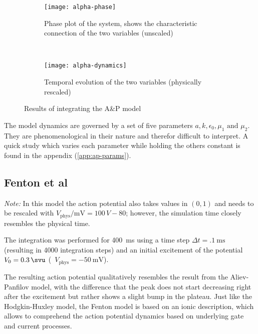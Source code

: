 \begin{figure}[h]
    \centering
    \begin{subfigure}[b]{.45\textwidth}
        \texttt{[image: alpha-phase]}
        \vspace{-\baselineskip}
        \label{fig:alphaphase}
        \caption{Phase plot of the system, shows the characteristic connection
        of the two variables (unscaled)}
    \end{subfigure}
    ~
    \begin{subfigure}[b]{.45\textwidth}
        \texttt{[image: alpha-dynamics]}
        \vspace{-\baselineskip}
        \label{fig:alphadyn}
        \caption{Temporal evolution of the two variables (physically rescaled)}
    \end{subfigure}
    \label{fig:alpha1}
    \caption{Results of integrating the A\&P model}
\end{figure}

The model dynamics are governed by a set of five parameters $a, k, \epsilon_0,
\mu_1\text{ and }\mu_2$. They are phenomenological in their nature and therefor
difficult to interpret. A quick study which varies each parameter while holding
the others constant is found in the appendix (\ref{app:ap-params}).


\subsection{Fenton et al}
\emph{Note:} In this model the action potential also takes values in $(0,1)$
and needs to be rescaled with $V_{\mathrm{phys}}/\si{\milli\volt}=100\,V-80$;
however, the simulation time closely resembles the physical time.

\vspace{\baselineskip}
The integration was performed for \SI{400}{\milli\second} using a time step
$\Delta{t}=\SI{.1}{\milli\second}$ (resulting in 4000 integration steps) and
an initial excitement of the potential $V_0=\SI{.3}{\svu}$
(\ie~$V_{\mathrm{phys}}=\SI{-50}{\milli\volt}$).

The resulting action potential qualitatively resembles the result from the
Aliev-Panfilov model, with the difference that the peak does not start
decreasing right after the excitement but rather shows a slight bump in the
plateau.
Just like the Hodgkin-Huxley model, the Fenton model is  based on an ionic
description, which allows to comprehend the action potential dynamics based on
underlying gate and current processes.

